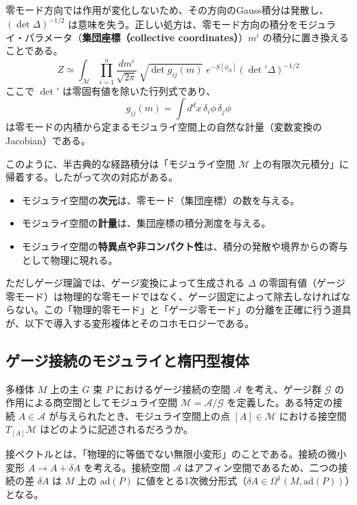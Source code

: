 \documentclass[uplatex, dvipdfmx, book]{jsbook}
\let\origsubsection\subsection
\let\origsubsubsection\subsubsection
\renewcommand{\section}{\origsubsection}
\renewcommand{\subsection}{\origsubsubsection}
\renewcommand{\subsubsection}{\paragraph}
\begin{document}
零モード方向では作用が変化しないため、その方向のGauss積分は発散し、$(\det\Delta)^{-1/2}$ は意味を失う。正しい処方は、零モード方向の積分をモジュライ・パラメータ（\textbf{集団座標（collective coordinates）}）$m^i$ の積分に置き換えることである。
\begin{equation}
    Z \simeq \int_{\mathcal{M}} \prod_{i=1}^{n} \frac{dm^i}{\sqrt{2\pi}}\, \sqrt{\det g_{ij}(m)}\; e^{-S[\phi_{\text{cl}}]} \left({\det}' \Delta\right)^{-1/2}
\end{equation}
ここで ${\det}'$ は零固有値を除いた行列式であり、
\begin{equation}
    g_{ij}(m) = \int d^dx\, \delta_i\phi\, \delta_j\phi
\end{equation}
は零モードの内積から定まるモジュライ空間上の自然な計量（変数変換のJacobian）である。

このように、半古典的な経路積分は「モジュライ空間 $\mathcal{M}$ 上の有限次元積分」に帰着する。したがって次の対応がある。
\begin{itemize}
    \item モジュライ空間の\textbf{次元}は、零モード（集団座標）の数を与える。
    \item モジュライ空間の\textbf{計量}は、集団座標の積分測度を与える。
    \item モジュライ空間の\textbf{特異点や非コンパクト性}は、積分の発散や境界からの寄与として物理に現れる。
\end{itemize}
ただしゲージ理論では、ゲージ変換によって生成される $\Delta$ の零固有値（ゲージ零モード）は物理的な零モードではなく、ゲージ固定によって除去しなければならない。この「物理的零モード」と「ゲージ零モード」の分離を正確に行う道具が、以下で導入する変形複体とそのコホモロジーである。

\section{ゲージ接続のモジュライと楕円型複体}

多様体 $M$ 上の主 $G$ 束 $P$ におけるゲージ接続の空間 $\mathcal{A}$ を考え、ゲージ群 $\mathcal{G}$ の作用による商空間としてモジュライ空間 $\mathcal{M} = \mathcal{A}/\mathcal{G}$ を定義した。ある特定の接続 $A \in \mathcal{A}$ が与えられたとき、モジュライ空間上の点 $[A] \in \mathcal{M}$ における接空間 $T_{[A]}\mathcal{M}$ はどのように記述されるだろうか。

接ベクトルとは、「物理的に等価でない無限小変形」のことである。接続の微小変形 $A \to A + \delta A$ を考える。接続空間 $\mathcal{A}$ はアフィン空間であるため、二つの接続の差 $\delta A$ は $M$ 上の $\mathrm{ad}(P)$ に値をとる1次微分形式（$\delta A \in \Omega^1(M, \mathrm{ad}(P))$）となる。
\end{document}
